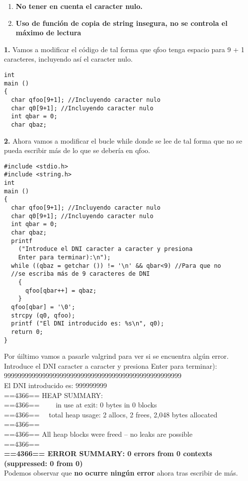 \begin{enumerate}
    \item \textbf{No tener en cuenta el caracter nulo.}
    \item \textbf{Uso de función de copia de string insegura}\textbf{, no se controla el máximo de lectura}

\end{enumerate}
\noindent \textbf{1.} Vamos a modificar el código de tal forma que qfoo tenga espacio para 9 + 1 caracteres, incluyendo así el caracter nulo.
\begin{verbatim}
int
main ()
{
  char qfoo[9+1]; //Incluyendo caracter nulo
  char q0[9+1]; //Incluyendo caracter nulo
  int qbar = 0;
  char qbaz;
\end{verbatim}
\newpage \noindent
\textbf{2.} Ahora vamos a modificar el bucle while donde se lee de tal forma que no se pueda escribir más de lo que se debería en qfoo.
\begin{verbatim}
#include <stdio.h>
#include <string.h>
int
main ()
{
  char qfoo[9+1]; //Incluyendo caracter nulo
  char q0[9+1]; //Incluyendo caracter nulo
  int qbar = 0;
  char qbaz;
  printf
    ("Introduce el DNI caracter a caracter y presiona 
    Enter para terminar):\n");
  while ((qbaz = getchar ()) != '\n' && qbar<9) //Para que no 
  //se escriba más de 9 caracteres de DNI
    {
      qfoo[qbar++] = qbaz;
    }
  qfoo[qbar] = '\0';
  strcpy (q0, qfoo);
  printf ("El DNI introducido es: %s\n", q0);
  return 0;
}
\end{verbatim}

\noindent Por úiltimo vamos a pasarle valgrind para ver si se encuentra algún error.
Introduce el DNI caracter a caracter y presiona Enter para terminar): 
\\
999999999999999999999999999999999999999999999999999 
\\
El DNI introducido es: 999999999 
\\
==4366== HEAP SUMMARY: 
\\
==4366==     in use at exit: 0 bytes in 0 blocks 
\\
==4366==   total heap usage: 2 allocs, 2 frees, 2,048 bytes allocated 
\\
==4366==  
\\
==4366== All heap blocks were freed -- no leaks are possible 
\\
==4366==  
\\
\textbf{==4366== ERROR SUMMARY: 0 errors from 0 contexts (suppressed: 0 from 0)}
\\
Podemos observar que \textbf{no ocurre ningún error} ahora tras escribir de más.

\afterpage{\blankpage}

                          
 
